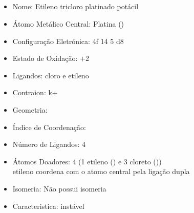 \documentclass[12pt]{article}
\begin{document}
\noindent\begin{minipage}{\textwidth}
	
	\subsection{}
	\begin{itemize}
   \item Nome:
   	Etileno tricloro platinado potácil
   
   \item Átomo Metálico Central:
   	Platina ()
   	
   \item Configuração Eletrónica:
   	4f 14 5 d8
   
   
   \item Estado de Oxidação:
   	+2
   
   \item Ligandos:
   	cloro e etileno
   
   \item Contraion:
   	k+
   
   \item Geometria:
   	
   
   \item Índice de Coordenação: 
   
   
   \item Número de Ligandos:
   	4
   
   \item Átomos Doadores:
   	4 (1 etileno () e 3 cloreto ())\\
		etileno coordena com o atomo central pela ligação dupla
   
   \item Isomeria:
   	Não possui isomeria
   	
   
   \item Caracteristica:
   	instável
   
	\end{itemize}
	
\end{minipage}
\end{document}
